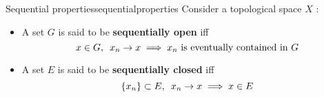 \begin{mydef}{Sequential properties}{sequentialproperties}
Consider a topological space $X$ :
	\begin{itemize}
		\item A set $G$ is said to be \textbf{sequentially open} iff
			$$x \in G, \enskip x_n \to x \implies x_n \textrm{ is eventually contained in } G$$
		\item A set $E$ is said to be \textbf{sequentially closed} iff
		$$\{x_n\} \subset E, \enskip x_n \to x \implies x \in E$$
	\end{itemize}
\end{mydef}

